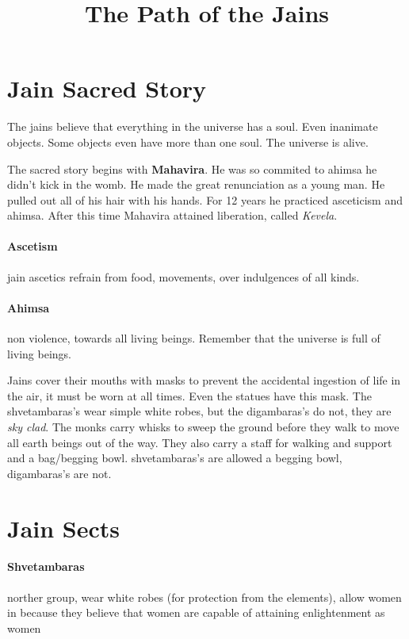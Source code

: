 \documentclass{article}
\begin{document}
\title{The Path of the Jains}
\maketitle
\section*{Jain Sacred Story}
\label{sec:jain_sacred_story}
The jains believe that everything in the universe has a soul. Even inanimate objects. Some objects even have more than one soul. The universe is alive.

The sacred story begins with \textbf{Mahavira}. He was so commited to ahimsa he didn't kick in the womb. He made the great renunciation as a young man. He pulled out all of his hair with his hands. For 12 years he practiced asceticism and ahimsa. After this time Mahavira attained liberation, called \emph{Kevela}.

\paragraph{Ascetism}
\label{par:ascetism}
jain ascetics refrain from food, movements, over indulgences of all kinds.

\paragraph{Ahimsa}
\label{par:ahimsa}
non violence, towards all living beings. Remember that the universe is full of living beings.

Jains cover their mouths with masks to prevent the accidental ingestion of life in the air, it must be worn at all times. Even the statues have this mask. The shvetambaras's wear simple white robes, but the digambaras's do not, they are \emph{sky clad}. The monks carry whisks to sweep the ground before they walk to move all earth beings out of the way. They also carry a staff for walking and support and a bag/begging bowl. shvetambaras's are allowed a begging bowl, digambaras's are not.

\section*{Jain Sects}
\label{sec:jain_sects}
\paragraph{Shvetambaras}
\label{par:shvetambaras}
norther group, wear white robes (for protection from the elements), allow women in because they believe that women are capable of attaining enlightenment as women
\end{document}
